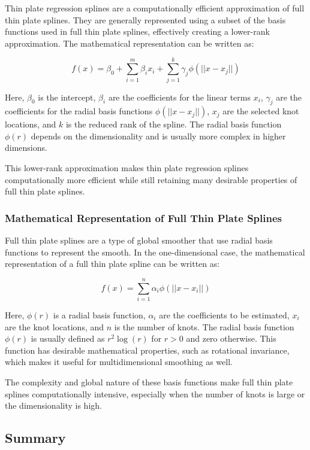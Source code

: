 \documentclass{article}
\begin{document}
Thin plate regression splines are a computationally efficient approximation of full thin plate splines. They are generally represented using a subset of the basis functions used in full thin plate splines, effectively creating a lower-rank approximation. The mathematical representation can be written as:

\[
f(x) = \beta_0 + \sum_{i=1}^{m} \beta_i x_i + \sum_{j=1}^{k} \gamma_j \phi(|| x - x_{j} ||)
\]

Here, \( \beta_0 \) is the intercept, \( \beta_i \) are the coefficients for the linear terms \( x_i \), \( \gamma_j \) are the coefficients for the radial basis functions \( \phi(|| x - x_{j} ||) \), \( x_j \) are the selected knot locations, and \( k \) is the reduced rank of the spline. The radial basis function \( \phi(r) \) depends on the dimensionality and is usually more complex in higher dimensions.

This lower-rank approximation makes thin plate regression splines computationally more efficient while still retaining many desirable properties of full thin plate splines.


\subsubsection{Mathematical Representation of Full Thin Plate Splines}

Full thin plate splines are a type of global smoother that use radial basis functions to represent the smooth. In the one-dimensional case, the mathematical representation of a full thin plate spline can be written as:

\[
f(x) = \sum_{i=1}^{n} \alpha_i \phi(|| x - x_i ||)
\]

Here, \( \phi(r) \) is a radial basis function, \( \alpha_i \) are the coefficients to be estimated, \( x_i \) are the knot locations, and \( n \) is the number of knots. The radial basis function \( \phi(r) \) is usually defined as \( r^2 \log(r) \) for \( r > 0 \) and zero otherwise. This function has desirable mathematical properties, such as rotational invariance, which makes it useful for multidimensional smoothing as well.

The complexity and global nature of these basis functions make full thin plate splines computationally intensive, especially when the number of knots is large or the dimensionality is high.




\subsection{Summary}
\end{document}
